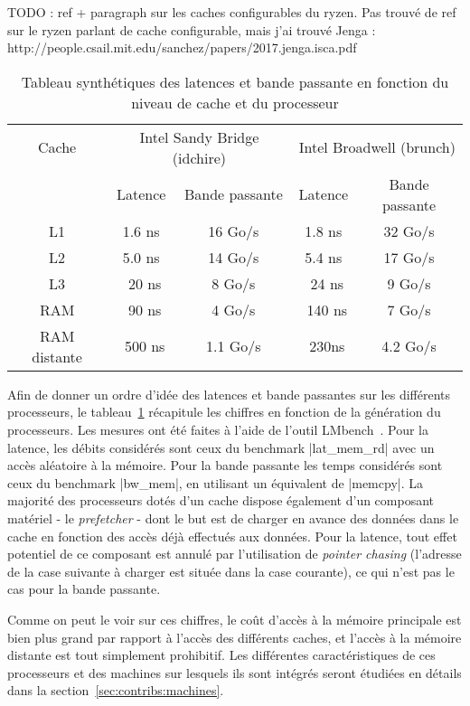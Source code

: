 \begin{todo}
TODO : ref + paragraph sur les caches configurables du ryzen.
Pas trouvé de ref sur le ryzen parlant de cache configurable, mais j'ai trouvé Jenga : http://people.csail.mit.edu/sanchez/papers/2017.jenga.isca.pdf
\end{todo}

\begin{table}[ht]
\def\arraystretch{1.5}
\centering
\begin{tabular}{|c||c|c|c|c|}\hline
  Cache & \multicolumn{2}{c|}{Intel Sandy Bridge (idchire)} & \multicolumn{2}{c|}{Intel Broadwell (brunch)}  \\ \cline{2-5} 
 & Latence & Bande passante & Latence & Bande passante \\ \hline
 L1 & 1.6 ns & 16 Go/s & 1.8 ns & 32 Go/s \\ \hline
 L2 & 5.0 ns & 14 Go/s & 5.4 ns & 17 Go/s \\ \hline
 L3 & ~20 ns & 8 Go/s & ~24 ns & 9 Go/s \\ \hline
 RAM & ~90 ns & 4 Go/s & ~140 ns & 7 Go/s \\ \hline
 RAM distante & ~500 ns & 1.1 Go/s & ~230ns & 4.2 Go/s \\ \hline
\end{tabular}
\caption{Tableau synthétiques des latences et bande passante en fonction du niveau de cache et du processeur}\label{tab:synthese-processeurs}
\end{table}

Afin de donner un ordre d'idée des latences et bande passantes sur les différents processeurs, le tableau~\ref{tab:synthese-processeurs} récapitule les chiffres en fonction de la génération du processeurs.
Les mesures ont été faites à l'aide de l'outil LMbench~\cite{McVoy1996}. Pour la latence, les débits considérés sont ceux du benchmark |lat_mem_rd| avec un accès aléatoire à la mémoire.
Pour la bande passante les temps considérés sont ceux du benchmark |bw_mem|, en utilisant un équivalent de |memcpy|.
La majorité des processeurs dotés d'un cache dispose également d'un composant matériel - le \emph{prefetcher} - dont le but est de charger en avance des données dans le cache en fonction des accès déjà effectués aux données.
Pour la latence, tout effet potentiel de ce composant est annulé par l'utilisation de \emph{pointer chasing} (l'adresse de la case suivante à charger est située dans la case courante), ce qui n'est pas le cas pour la bande passante.

Comme on peut le voir sur ces chiffres, le coût d'accès à la mémoire principale est bien plus grand par rapport à l'accès des différents caches, et l'accès à la mémoire distante est tout simplement prohibitif.
Les différentes caractéristiques de ces processeurs et des machines sur lesquels ils sont intégrés seront étudiées en détails dans la section~\ref{sec:contribs:machines}.

